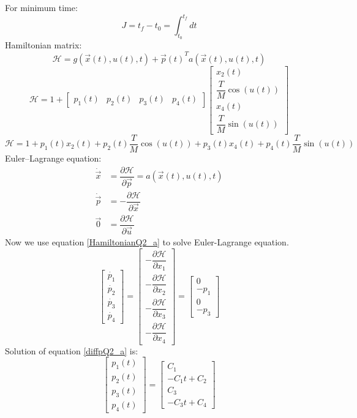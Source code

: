 For minimum time:
$$J = t_f - t_0 = \int_{t_0}^{t_f} dt$$
Hamiltonian matrix:
$$\mathcal{H} =  g(\vec x(t), u(t), t) + {\vec{p}(t)}^Ta(\vec x(t), u(t), t)$$
$$\mathcal{H} = 1 + \begin{bmatrix} 
	p_1(t) & p_2(t) & p_3(t) & p_4(t)
\end{bmatrix} \begin{bmatrix}
	x_2(t)\\
	\dfrac{T}{M} \cos(u(t))\\
	x_4(t)\\
	\dfrac{T}{M} \sin(u(t))
\end{bmatrix}$$
\begin{equation} \label{HamiltonianQ2_a}
	\mathcal{H} = 1 + p_1(t)x_2(t) + p_2(t)\dfrac{T}{M}\cos(u(t)) +p_3(t)x_4(t) +p_4(t)\dfrac{T}{M}\sin(u(t))
\end{equation}
Euler–Lagrange equation:
\begin{align}
	\dot{\vec{x}} &= \dfrac{\partial \mathcal{H} }{\partial \vec{p}} = a(\vec x(t), u(t), t)\\
	\dot{\vec{p}} &= -\dfrac{\partial \mathcal{H} }{\partial \vec{x}} \\
	{\vec{0}} &= \dfrac{\partial \mathcal{H} }{\partial \vec{u}}
\end{align}
Now  we use equation \ref{HamiltonianQ2_a} to solve Euler-Lagrange equation.
\begin{equation}\label{diffpQ2_a}
	\begin{bmatrix}
		\dot{p_1}\\
		\dot{p_2}\\
		\dot{p_3}\\
		\dot{p_4}
	\end{bmatrix} = \begin{bmatrix}
		-\dfrac{\partial \mathcal{H}}{\partial x_1} \\[10 pt]
		-\dfrac{\partial \mathcal{H}}{\partial x_2} \\[10 pt]
		-\dfrac{\partial \mathcal{H}}{\partial x_3} \\[10 pt]
		-\dfrac{\partial \mathcal{H}}{\partial x_4} 
	\end{bmatrix} = \begin{bmatrix}
		0 \\
		-p_1\\
		0\\
		-p_3
	\end{bmatrix}
\end{equation} 
Solution of equation \ref{diffpQ2_a} is:
\begin{equation}\label{SolvepQ2_a}
	\begin{bmatrix}
		p_1(t)\\
		p_2(t)\\
		p_3(t)\\
		p_4(t)
	\end{bmatrix} = \begin{bmatrix}
		C_1\\
		-C_1t+C_2\\
		C_3\\
		-C_3t+C_4
	\end{bmatrix} 
\end{equation}
